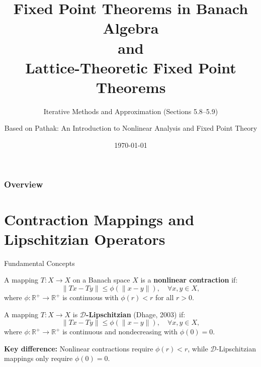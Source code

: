 \documentclass[aspectratio=169,10pt]{beamer}
\title[Chapter 4d: Fixed Point Theorems in Banach Algebra and Lattices]{
    Fixed Point Theorems in Banach Algebra\\[0.3cm]
    and\\[0.3cm]
    Lattice-Theoretic Fixed Point Theorems
}
\subtitle{Iterative Methods and Approximation (Sections 5.8--5.9)}
\author{Based on Pathak: An Introduction to Nonlinear Analysis and Fixed Point Theory}
\date{\today}
\begin{document}
\frame{\titlepage}

\begin{frame}
    \frametitle{Overview}
    \tableofcontents
\end{frame}

\section{Contraction Mappings and Lipschitzian Operators}

\begin{frame}[fragile]{Fundamental Concepts}
    \begin{definition}
        A mapping $T: X \to X$ on a Banach space $X$ is a \textbf{nonlinear contraction} if:
        \[
            \|Tx - Ty\| \leq \phi(\|x - y\|), \quad \forall x, y \in X,
        \]
        where $\phi: \mathbb{R}^+ \to \mathbb{R}^+$ is continuous with $\phi(r) < r$ for all $r > 0$.
    \end{definition}

    \begin{definition}
        A mapping $T: X \to X$ is \textbf{$\mathcal{D}$-Lipschitzian} (Dhage, 2003) if:
        \[
            \|Tx - Ty\| \leq \phi(\|x - y\|), \quad \forall x, y \in X,
        \]
        where $\phi: \mathbb{R}^+ \to \mathbb{R}^+$ is continuous and nondecreasing with $\phi(0) = 0$.
    \end{definition}

    \textbf{Key difference:} Nonlinear contractions require $\phi(r) < r$, while $\mathcal{D}$-Lipschitzian
    mappings only require $\phi(0) = 0$.
\end{frame}
\end{document}
